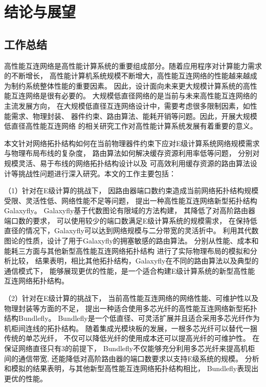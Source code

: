 \chapter{结论与展望}

\section{工作总结}

 高性能互连网络是高性能计算系统的重要组成部分。随着应用程序对计算能力需求的不断增长，
 高性能计算机系统规模不断增大，高性能互连网络的性能越来越成为制约系统整体性能的重要因素。
 因此，设计面向未来更大规模计算系统的高性能互连网络是很有必要的。
 大规模低直径网络的是当前与未来高性能互连网络的主流发展方向，
 在大规模低直径互连网络设计中，需要考虑很多限制因素，如性能需求、物理封装、
 器件约束、路由算法、能耗开销等问题。因此，开展大规模低直径高性能互连网络
 的相关研究工作对高性能计算系统发展有着重要的意义。

 本文针对网络拓扑结构如何在当前物理器件约束下应对E级计算系统网络规模需求
 与物理布局布线的复杂度，
 路由算法如何解决缓存资源利用率低等问题，
 分别对规模灵活、易于布线的网络拓扑结构设计以及
 可高效利用缓存资源的路由算法设计等挑战性问题进行深入研究。本文的工作主要包括：

  （1）针对在E级计算的挑战下，
  因路由器端口数约束造成当前网络拓扑结构规模受限、灵活性低、网络性能不足等问题，
  提出一种高性能互连网络新型拓扑结构Galaxyfly。
  Galaxyfly基于代数图论有限域的方法构建，
  其降低了对高阶路由器端口数的要求，
  可以使用较少的端口数满足E级计算系统的规模需求，
  在保持低直径的情况下，Galaxyfly可以达到网络规模与二分带宽的灵活折中。
  利用其代数图论的性质，设计了用于Galaxyfly的拥塞敏感的路由算法。
  分别从性能、成本和能耗三方面与其他新型高性能互连网络拓扑结构
  进行了实际物理布局的模拟和分析比较，
  结果表明，相比其他拓扑结构，Galaxyfly在不同的路由算法以及典型的通信模式下，
  能够展现更优的性能，是一个适合构建E级计算系统的新型高性能互连网络拓扑结构。

  （2）针对在E级计算的挑战下，
  当前高性能互连网络的网络性能、可维护性以及物理封装等方面的不足，
  提出一种适合使用多芯光纤的高性能互连网络新型拓扑结构Bundlefly。
  Bundlefly是一个低直径、可灵活扩展并且适合采用多芯光纤作为机柜间连线的拓扑结构。
  随着集成光模块板的发展，一根多芯光纤可以替代一捆传统的单芯光纤，
  不仅可以降低光纤的使用成本还可以提高光纤的可维护性。
  在保证网络直径只有3的前提下，
  Bundlefly不仅能够充分利用多芯光纤来提高机柜间的通信带宽,
  还能降低对高阶路由器的端口数要求以支持E级系统的规模。
  分析和模拟的结果表明，与其他新型高性能互连网络拓扑结构相比，
  Bundlefly表现出更优的性能。

